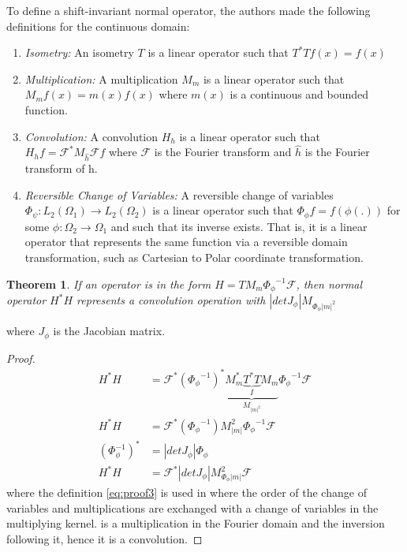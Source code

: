 \documentclass[journal, onecolumn, 11pt]{IEEEtran}
\newtheorem{theorem}{Theorem}
\begin{document}
To define a shift-invariant normal operator, the authors made the following definitions for the continuous domain: 
\begin{enumerate}
    \item \textit{Isometry:} An isometry $T$ is a linear operator such that $T^\ast T {f}(x) = f(x)$
    \item \textit{Multiplication:} A multiplication $M_m$ is a linear operator such that $M_m{f}(x) = m(x)f(x)$ where $m(x)$ is a continuous and bounded function.  
    \item \textit{Convolution:} A convolution $H_h$ is a linear operator such that $H_hf = \mathcal{F}^\ast M_{\hat{h}} \mathcal{F} f$ where $\mathcal{F}$ is the Fourier transform and $\hat{h}$ is the Fourier transform of h. 
    \item \textit{Reversible Change of Variables:} A reversible change of variables $\Phi_\psi: L_2(\Omega_1) \rightarrow L_2(\Omega_2)$ is a linear operator such that $\Phi_\phi f = f(\phi(.))$ for some $\phi: \Omega_2 \rightarrow \Omega_1$ and such that its inverse exists. That is, it is a linear operator that represents the same function via a reversible domain transformation, such as Cartesian to Polar coordinate transformation. 
\end{enumerate}

\begin{theorem}
    If an operator is in the form $H = TM_m{\Phi_\phi}^{-1}\mathcal{F}$, then normal operator $H^\ast H$ represents a convolution operation with $|det J_\phi| M_{\Phi_\phi |m|^2}$
    \label{thrm:Theorem1}
\end{theorem}
where $J_\phi$ is the Jacobian matrix.

\begin{proof}
    \begin{align}
        H^\ast H &= \mathcal{F}^\ast ({\Phi_\phi}^{-1})^\ast \underbrace{M_m^\ast \underbrace{T^\ast T}_{I} M_m}_{M_{{|m|}^2}} {\Phi_\phi}^{-1} \mathcal{F} \label{eq:proof1}\\ 
        H^\ast H &= \mathcal{F}^\ast ({\Phi_\phi}^{-1}) M_{|m|}^2 {\Phi_\phi}^{-1} \mathcal{F} \label{eq:proof2}\\
        (\Phi_\phi^{-1})^\ast &= |det J_\phi|\Phi_\phi \label{eq:proof3}\\
        H^\ast H &= \mathcal{F}^\ast |det J_\phi| M_{\Phi_\phi|m|}^2  \mathcal{F} \label{eq:proof4}
    \end{align}
    where the definition \ref{eq:proof3} is used in  where the order of the change of variables and multiplications are exchanged with a change of variables in the multiplying kernel.  is a multiplication in the Fourier domain and the inversion following it, hence it is a convolution.
\end{proof}
\end{document}
